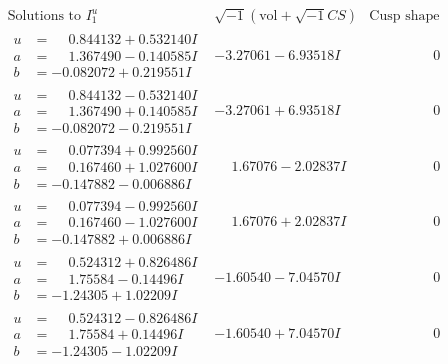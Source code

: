 \documentclass[1p]{elsarticle_modified}
\theoremstyle{definition}
\newcommand{\I}{\sqrt{-1}}
\begin{document}
$$\begin{array}{c|c|c}  
\text{Solutions to }I^u_{1}& \I (\text{vol} + \sqrt{-1}CS) & \text{Cusp shape}\\
 \hline 
\begin{aligned}
u &= \phantom{-}0.844132 + 0.532140 I \\
a &= \phantom{-}1.367490 - 0.140585 I \\
b &= -0.082072 + 0.219551 I\end{aligned}
 & -3.27061 - 6.93518 I & \phantom{-0.000000 } 0 \\ \hline\begin{aligned}
u &= \phantom{-}0.844132 - 0.532140 I \\
a &= \phantom{-}1.367490 + 0.140585 I \\
b &= -0.082072 - 0.219551 I\end{aligned}
 & -3.27061 + 6.93518 I & \phantom{-0.000000 } 0 \\ \hline\begin{aligned}
u &= \phantom{-}0.077394 + 0.992560 I \\
a &= \phantom{-}0.167460 + 1.027600 I \\
b &= -0.147882 - 0.006886 I\end{aligned}
 & \phantom{-}1.67076 - 2.02837 I & \phantom{-0.000000 } 0 \\ \hline\begin{aligned}
u &= \phantom{-}0.077394 - 0.992560 I \\
a &= \phantom{-}0.167460 - 1.027600 I \\
b &= -0.147882 + 0.006886 I\end{aligned}
 & \phantom{-}1.67076 + 2.02837 I & \phantom{-0.000000 } 0 \\ \hline\begin{aligned}
u &= \phantom{-}0.524312 + 0.826486 I \\
a &= \phantom{-}1.75584 - 0.14496 I \\
b &= -1.24305 + 1.02209 I\end{aligned}
 & -1.60540 - 7.04570 I & \phantom{-0.000000 } 0 \\ \hline\begin{aligned}
u &= \phantom{-}0.524312 - 0.826486 I \\
a &= \phantom{-}1.75584 + 0.14496 I \\
b &= -1.24305 - 1.02209 I\end{aligned}
 & -1.60540 + 7.04570 I & \phantom{-0.000000 } 0 \\ \hline\begin{aligned}

\end{aligned}
\end{array}$$
\end{document}
